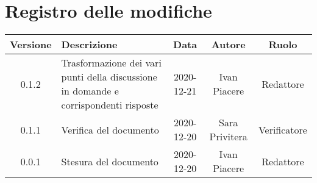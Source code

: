 \section*{Registro delle modifiche}

\begin{center}
	\begin{longtable}{|c|p{5cm}|c|c|c|}
	\hline
	\rowcolor{lighter-grayer}
	\textbf{Versione} & \textbf{Descrizione} & \textbf{Data} & \textbf{Autore} & \textbf{Ruolo} \\
	\hline
	\endfirsthead


	\hline
	0.1.2 & Trasformazione dei vari punti della discussione in domande e corrispondenti risposte & 2020-12-21 & Ivan Piacere & Redattore \\
	\hline
	0.1.1 & Verifica del documento & 2020-12-20 & Sara Privitera & Verificatore \\
	\hline
	0.0.1 & Stesura del documento & 2020-12-20 & Ivan Piacere & Redattore \\
	\hline
	\end{longtable}
\end{center}